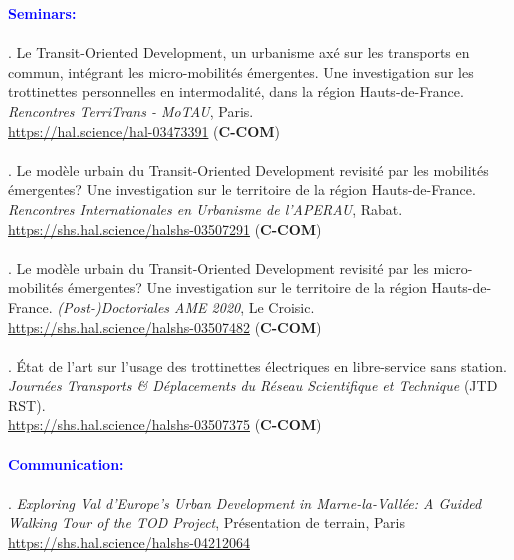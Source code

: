 \begin{refsegment}
    \begin{tcolorbox}[colback=white!5!white,
                      colframe=blue!75!blue,
                      title=Valorization
                      \\
                      Chapitre~1]
\Large{\textcolor{blue}{\textbf{Seminars:}}}
    \\\\
\small{\textcolor{blue}{\textcite{moinse_transit-oriented_2021}}. Le Transit-Oriented Development, un urbanisme axé sur les transports en commun, intégrant les micro-mobilités émergentes. Une investigation sur les trottinettes personnelles en intermodalité, dans la région Hauts-de-France. \textsl{Rencontres TerriTrans - MoTAU}, Paris.
\\
\footnotesize{\url{https://hal.science/hal-03473391}} (\textbf{C-COM})}
    \\\\
\small{\textcolor{blue}{\textcite{moinse_modeurbain_2021}}. Le modèle urbain du Transit-Oriented Development revisité par les mobilités émergentes? Une investigation sur le territoire de la région Hauts-de-France. \textsl{Rencontres Internationales en Urbanisme de l'APERAU}, Rabat.
\\
\footnotesize{\url{https://shs.hal.science/halshs-03507291}} (\textbf{C-COM})}
    \\\\
\small{\textcolor{blue}{\textcite{moinse_modeurbain_2020}}. Le modèle urbain du Transit-Oriented Development revisité par les micro-mobilités émergentes? Une investigation sur le territoire de la région Hauts-de-France. \textsl{(Post-)Doctoriales AME 2020}, Le Croisic.
\\
\footnotesize{\url{https://shs.hal.science/halshs-03507482}} (\textbf{C-COM})}
    \\\\
\small{\textcolor{blue}{\textcite{moinse_etat_2020}}. État de l'art sur l'usage des trottinettes électriques en libre-service sans station. \textsl{Journées Transports \& Déplacements du Réseau Scientifique et Technique} (JTD RST). 
\\
\footnotesize{\url{https://shs.hal.science/halshs-03507375}} (\textbf{C-COM})}
    \\\\
\Large{\textcolor{blue}{\textbf{Communication:}}}
    \\\\
\normalsize{\textcolor{blue}{\textcite{moinse_exploring_2023}}. \foreignlanguage{english}{\textsl{Exploring Val d'Europe's Urban Development in Marne-la-Vallée: A Guided Walking Tour of the TOD Project}}, Présentation de terrain, Paris
\\
\footnotesize{\url{https://shs.hal.science/halshs-04212064}}}
    \end{tcolorbox}

    \newpage
    \begingroup
    \renewcommand{\bibfont}{\scriptsize}
\printbibliography[segment=\therefsegment, heading=subbibintoc, title={Bibliography of Chapter~1}, label=chap1:bibliographie]
    \endgroup
    \end{refsegment}